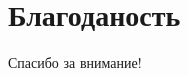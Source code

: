 \begin{frame}{}


\end{frame}


\begin{frame}{}
	\begin{columns}
		\begin{column}{0.55\textwidth}

		\end{column}

		\begin{column}{0.45\textwidth}


		\end{column}
	\end{columns}
\end{frame}


\begin{frame}{}
\end{frame}


\begin{frame}{}

\end{frame}


\begin{frame}{}
\end{frame}

\begin{frame}{}
\end{frame}


\begin{frame}{}

\end{frame}


\begin{frame}{}
\end{frame}


\section{Благоданость}
\begin{frame}
	\centering
	\huge
	Спасибо за внимание!
\end{frame}



